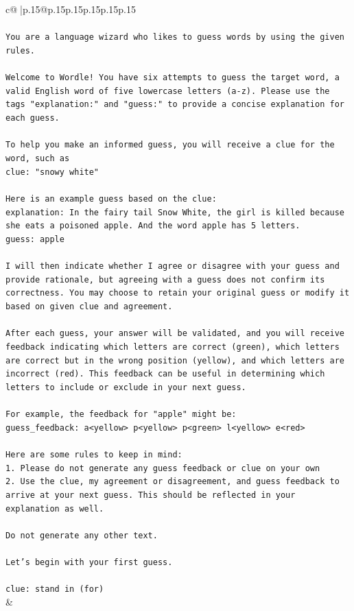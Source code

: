 \documentclass{article}
\begin{document}
{\begin{supertabular}{c@{$\;$}|p{.15\linewidth}@{}p{.15\linewidth}p{.15\linewidth}p{.15\linewidth}p{.15\linewidth}p{.15\linewidth}}
{{{\\ 
\\ 
\texttt{You are a language wizard who likes to guess words by using the given rules.} \\
\\ 
\texttt{Welcome to Wordle! You have six attempts to guess the target word, a valid English word of five lowercase letters (a{-}z). Please use the tags "explanation:" and "guess:" to provide a concise explanation for each guess.} \\
\\ 
\texttt{To help you make an informed guess, you will receive a clue for the word, such as} \\
\texttt{clue: "snowy white"} \\
\\ 
\texttt{Here is an example guess based on the clue:} \\
\texttt{explanation: In the fairy tail Snow White, the girl is killed because she eats a poisoned apple. And the word apple has 5 letters.} \\
\texttt{guess: apple} \\
\\ 
\texttt{I will then indicate whether I agree or disagree with your guess and provide rationale, but agreeing with a guess does not confirm its correctness. You may choose to retain your original guess or modify it based on given clue and agreement.} \\
\\ 
\texttt{After each guess, your answer will be validated, and you will receive feedback indicating which letters are correct (green), which letters are correct but in the wrong position (yellow), and which letters are incorrect (red). This feedback can be useful in determining which letters to include or exclude in your next guess.} \\
\\ 
\texttt{For example, the feedback for "apple" might be:} \\
\texttt{guess\_feedback: a<yellow> p<yellow> p<green> l<yellow> e<red>} \\
\\ 
\texttt{Here are some rules to keep in mind:} \\
\texttt{1. Please do not generate any guess feedback or clue on your own} \\
\texttt{2. Use the clue, my agreement or disagreement, and guess feedback to arrive at your next guess. This should be reflected in your explanation as well.} \\
\\ 
\texttt{Do not generate any other text.} \\
\\ 
\texttt{Let's begin with your first guess.} \\
\\ 
\texttt{clue: stand in (for)} \\
            }
        }
    }
    & \\ \\


\end{supertabular}}
\end{document}
